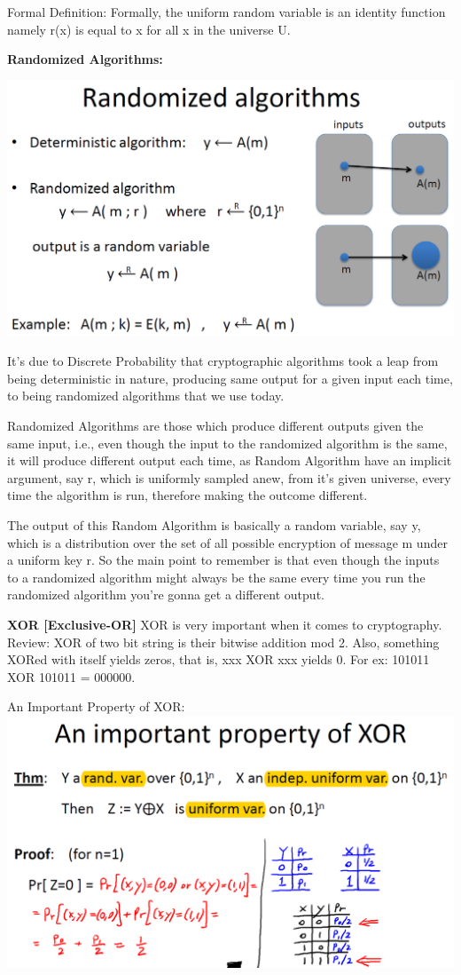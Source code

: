 \documentclass[11pt]{article}
\makeatletter
\def\maxwidth{\ifdim\Gin@nat@width>\linewidth\linewidth
    \else\Gin@nat@width\fi}
\let\Oldincludegraphics\includegraphics
\renewcommand{\includegraphics}[1]{\Oldincludegraphics[width=.8\maxwidth]{#1}}
\makeatother
\begin{document}
Formal Definition: Formally, the uniform random variable is an identity
function namely r(x) is equal to x for all x in the universe U.

\textbf{Randomized Algorithms:}

\includegraphics{./Images/RandomAlgs.png}

It's due to Discrete Probability that cryptographic algorithms took a
leap from being deterministic in nature, producing same output for a
given input each time, to being randomized algorithms that we use today.

Randomized Algorithms are those which produce different outputs given
the same input, i.e., even though the input to the randomized algorithm
is the same, it will produce different output each time, as Random
Algorithm have an implicit argument, say r, which is uniformly sampled
anew, from it's given universe, every time the algorithm is run,
therefore making the outcome different.

The output of this Random Algorithm is basically a random variable, say
y, which is a distribution over the set of all possible encryption of
message m under a uniform key r. So the main point to remember is that
even though the inputs to a randomized algorithm might always be the
same every time you run the randomized algorithm you're gonna get a
different output.

\textbf{XOR {[}Exclusive-OR{]}} XOR is very important when it comes to
cryptography. Review: XOR of two bit string is their bitwise addition
mod 2. Also, something XORed with itself yields zeros, that is, xxx XOR
xxx yields 0. For ex: 101011 XOR 101011 = 000000.

An Important Property of XOR:
\includegraphics{./Images/XOR-Property.png}
\end{document}
